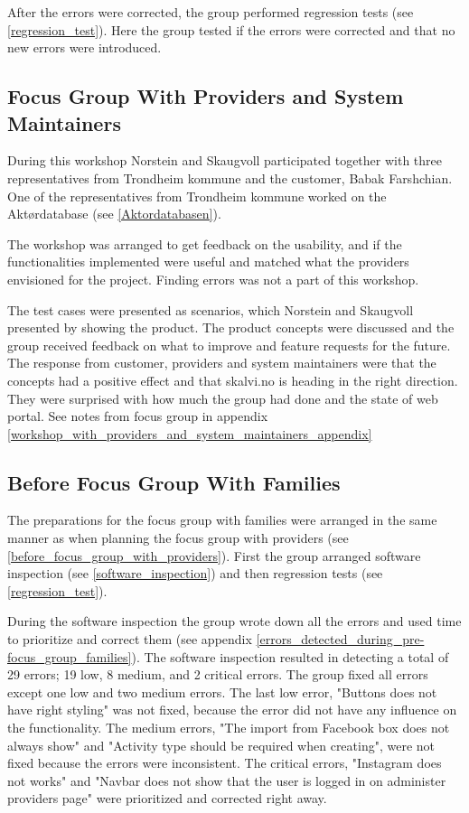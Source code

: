After the errors were corrected, the group performed regression tests (see \ref{regression_test}). Here the group tested if the errors were corrected and that no new errors were introduced.


\subsection{Focus Group With Providers and System Maintainers}
\label{focusGrouoProviders}
During this workshop Norstein and Skaugvoll participated together with three representatives from Trondheim kommune and the customer, Babak Farshchian. One of the representatives from Trondheim kommune worked on the Aktørdatabase (see \ref{Aktordatabasen}).

The workshop was arranged to get feedback on the usability, and if the functionalities implemented were useful and matched what the providers envisioned for the project. Finding errors was not a part of this workshop.

The test cases were presented as scenarios, which Norstein and Skaugvoll presented by showing the product. The product concepts were discussed and the group received feedback on what to improve and feature requests for the future. The response from customer, providers and system maintainers were that the concepts had a positive effect and that skalvi.no is heading in the right direction. They were surprised with how much the group had done and the state of web portal. See notes from focus group in appendix \ref{workshop_with_providers_and_system_maintainers_appendix}


\subsection{Before Focus Group With Families}
\label{before_focus_group_with_families}
The preparations for the focus group with families were arranged in the same manner as when planning the focus group with providers (see \ref{before_focus_group_with_providers}). First the group arranged software inspection (see \ref{software_inspection}) and then regression tests (see \ref{regression_test}). 

During the software inspection the group wrote down all the errors and used time to prioritize and correct them (see appendix \ref{errors_detected_during_pre-focus_group_families}). The software inspection resulted in detecting a total of 29 errors; 19 low, 8 medium, and 2 critical errors. The group fixed all errors except one low and two medium errors. The last low error, "Buttons does not have right styling" was not fixed, because the error did not have any influence on the functionality. The medium errors, "The import from Facebook box does not always show" and "Activity type should be required when creating", were not fixed because the errors were inconsistent. The critical errors, "Instagram does not works" and "Navbar does not show that the user is logged in on administer providers page" were prioritized and corrected right away.


